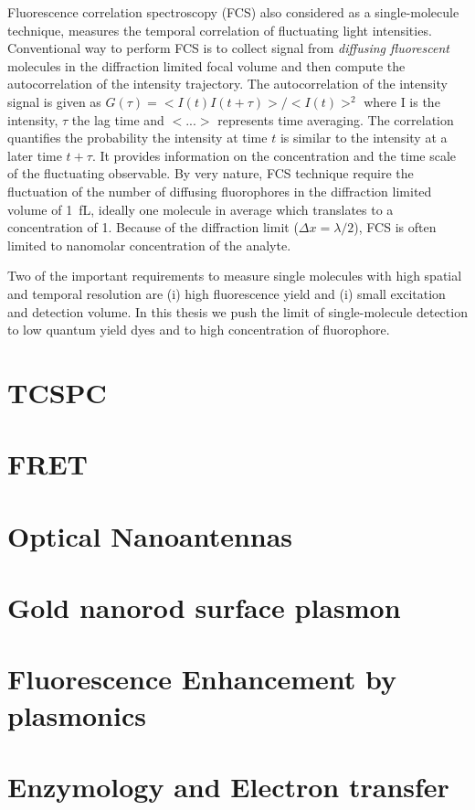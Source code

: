 \documentclass[11pt,a4paper,onecolumn]{article}
\begin{document}
Fluorescence correlation spectroscopy (FCS) also considered as a single-molecule technique, measures the temporal correlation of fluctuating light intensities.
Conventional way to perform FCS is to collect signal from \textit{diffusing fluorescent} molecules in the diffraction limited focal volume and then compute the autocorrelation of the intensity trajectory.
The autocorrelation of the intensity signal is given as $G(\tau)=<I(t)I(t+\tau)>/<I(t)>^2$ where I is the intensity, $\tau$ the lag time and $<...>$ represents time averaging.
The correlation quantifies the probability the intensity at time $t$ is similar to the intensity at a later time $t+\tau$.
It provides information on the concentration and the time scale of the fluctuating observable.
By very nature, FCS technique require the fluctuation of the number of diffusing fluorophores in the diffraction limited volume of \SI{1}{fL}, ideally one molecule in average which translates to a concentration of \SI{1}{\nM}.
Because of the diffraction limit ($\Delta{x}={\lambda}/2$), FCS is often limited to nanomolar concentration of the analyte. 

Two of the important requirements to measure single molecules with high spatial and temporal resolution are (i) high fluorescence yield and (i) small excitation and detection volume.
In this thesis we push the limit of single-molecule detection to low quantum yield dyes and to high concentration of fluorophore.
\section{TCSPC}

\section{FRET}
%
\section{Optical Nanoantennas}
\section{Gold nanorod surface plasmon}
\section{Fluorescence Enhancement by plasmonics}
%
\section{Enzymology and Electron transfer}
\end{document}
